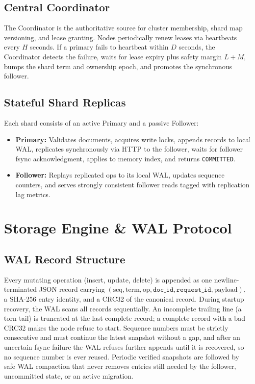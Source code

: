 \documentclass[10pt,journal,compsoc]{IEEEtran}
\begin{document}
\subsection{Central Coordinator}
The Coordinator is the authoritative source for cluster membership, shard map versioning, and lease granting. Nodes periodically renew leases via heartbeats every $H$ seconds. If a primary fails to heartbeat within $D$ seconds, the Coordinator detects the failure, waits for lease expiry plus safety margin $L + M$, bumps the shard term and ownership epoch, and promotes the synchronous follower.

\subsection{Stateful Shard Replicas}
Each shard consists of an active Primary and a passive Follower:
\begin{itemize}
    \item \textbf{Primary:} Validates documents, acquires write locks, appends records to local WAL, replicates synchronously via HTTP to the follower, waits for follower fsync acknowledgment, applies to memory index, and returns \texttt{COMMITTED}.
    \item \textbf{Follower:} Replays replicated ops to its local WAL, updates sequence counters, and serves strongly consistent follower reads tagged with replication lag metrics.
\end{itemize}

\section{Storage Engine \& WAL Protocol}

\subsection{WAL Record Structure}
Every mutating operation (insert, update, delete) is appended as one newline-terminated JSON record carrying $(\text{seq}, \text{term}, \text{op}, \texttt{doc\_id}, \texttt{request\_id}, \text{payload})$, a SHA-256 entry identity, and a CRC32 of the canonical record.
During startup recovery, the WAL scans all records sequentially. An incomplete trailing line (a torn tail) is truncated at the last complete record; a complete record with a bad CRC32 makes the node refuse to start. Sequence numbers must be strictly consecutive and must continue the latest snapshot without a gap, and after an uncertain fsync failure the WAL refuses further appends until it is recovered, so no sequence number is ever reused. Periodic verified snapshots are followed by safe WAL compaction that never removes entries still needed by the follower, uncommitted state, or an active migration.
\end{document}
